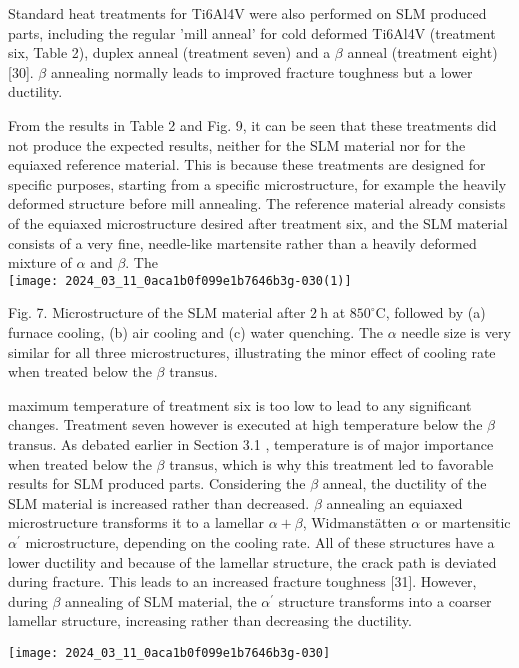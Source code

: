 \documentclass[10pt]{article}
\begin{document}
Standard heat treatments for Ti6Al4V were also performed on SLM produced parts, including the regular 'mill anneal' for cold deformed Ti6Al4V (treatment six, Table 2), duplex anneal (treatment seven) and a $\beta$ anneal (treatment eight) [30]. $\beta$ annealing normally leads to improved fracture toughness but a lower ductility.

From the results in Table 2 and Fig. 9, it can be seen that these treatments did not produce the expected results, neither for the SLM material nor for the equiaxed reference material. This is because these treatments are designed for specific purposes, starting from a specific microstructure, for example the heavily deformed structure before mill annealing. The reference material already consists of the equiaxed microstructure desired after treatment six, and the SLM material consists of a very fine, needle-like martensite rather than a heavily deformed mixture of $\alpha$ and $\beta$. The\\
\texttt{[image: 2024\_03\_11\_0aca1b0f099e1b7646b3g-030(1)]}

Fig. 7. Microstructure of the SLM material after $2 \mathrm{~h}$ at $850^{\circ} \mathrm{C}$, followed by (a) furnace cooling, (b) air cooling and (c) water quenching. The $\alpha$ needle size is very similar for all three microstructures, illustrating the minor effect of cooling rate when treated below the $\beta$ transus.

maximum temperature of treatment six is too low to lead to any significant changes. Treatment seven however is executed at high temperature below the $\beta$ transus. As debated earlier in Section 3.1 , temperature is of major importance when treated below the $\beta$ transus, which is why this treatment led to favorable results for SLM produced parts. Considering the $\beta$ anneal, the ductility of the SLM material is increased rather than decreased. $\beta$ annealing an equiaxed microstructure transforms it to a lamellar $\alpha+\beta$, Widmanstätten $\alpha$ or martensitic $\alpha^{\prime}$ microstructure, depending on the cooling rate. All of these structures have a lower ductility and because of the lamellar structure, the crack path is deviated during fracture. This leads to an increased fracture toughness [31]. However, during $\beta$ annealing of SLM material, the $\alpha^{\prime}$ structure transforms into a coarser lamellar structure, increasing rather than decreasing the ductility.

\begin{center}
\texttt{[image: 2024\_03\_11\_0aca1b0f099e1b7646b3g-030]}
\end{center}
\end{document}
